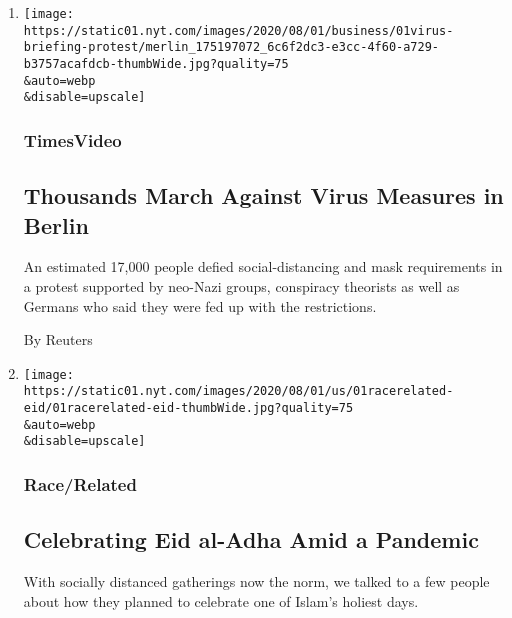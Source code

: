 \begin{enumerate}
\def\labelenumi{\arabic{enumi}.}
\item
  \href{/video/world/europe/100000007268465/coronavirus-protest-germany.html}{}

  \texttt{[image: https://static01.nyt.com/images/2020/08/01/business/01virus-briefing-protest/merlin\_175197072\_6c6f2dc3-e3cc-4f60-a729-b3757acafdcb-thumbWide.jpg?quality=75\\\&auto=webp\\\&disable=upscale]}

  \hypertarget{timesvideo}{%
  \subsubsection{TimesVideo}\label{timesvideo}}

  \hypertarget{thousands-march-against-virus-measures-in-berlin}{%
  \subsection{Thousands March Against Virus Measures in
  Berlin}\label{thousands-march-against-virus-measures-in-berlin}}

  An estimated 17,000 people defied social-distancing and mask
  requirements in a protest supported by neo-Nazi groups, conspiracy
  theorists as well as Germans who said they were fed up with the
  restrictions.

  By Reuters
\item
  \href{/2020/08/01/us/eid-al-adha-coronavirus.html}{}

  \texttt{[image: https://static01.nyt.com/images/2020/08/01/us/01racerelated-eid/01racerelated-eid-thumbWide.jpg?quality=75\\\&auto=webp\\\&disable=upscale]}

  \hypertarget{racerelated}{%
  \subsubsection{Race/Related}\label{racerelated}}

  \hypertarget{celebrating-eid-al-adha-amid-a-pandemic}{%
  \subsection{Celebrating Eid al-Adha Amid a
  Pandemic}\label{celebrating-eid-al-adha-amid-a-pandemic}}

  With socially distanced gatherings now the norm, we talked to a few
  people about how they planned to celebrate one of Islam's holiest
  days.


\end{enumerate}
